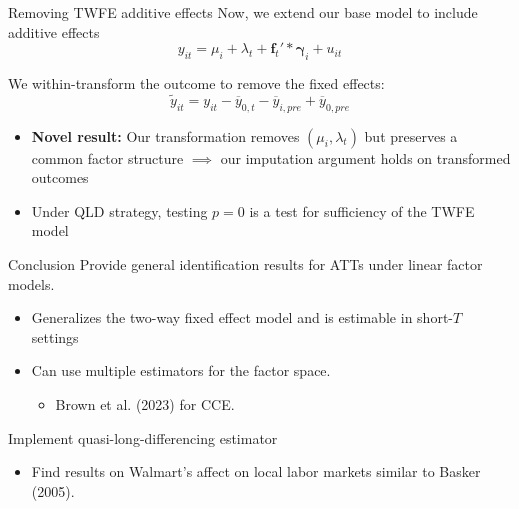 \documentclass[aspectratio=169,t,11pt]{beamer}
\begin{document}
\begin{frame}{Removing TWFE additive effects}\label{slide:remove_additive_fe}
  Now, we extend our base model to include additive effects
  $$
    y_{it} = \mu_i + \lambda_t + \bm{f}_t' * \bm{\gamma}_{i} + u_{it}
  $$
  
  We within-transform the outcome to remove the fixed effects:
  $$
    \tilde{y}_{it} = y_{it} - \overline{y}_{0,t} - \overline{y}_{i,pre} + \overline{y}_{0,pre}
  $$
  \begin{itemize}
    \item \textbf{Novel result:} Our transformation removes $(\mu_i, \lambda_t)$ but preserves a common factor structure $\implies$ our imputation argument holds on transformed outcomes
    
    \item Under QLD strategy, testing $p = 0$ is a test for sufficiency of the TWFE model
  \end{itemize}


\end{frame}


\begin{frame}{Conclusion}
  Provide general identification results for ATTs under linear factor models. 
  \begin{itemize}
      \item Generalizes the two-way fixed effect model and is estimable in short-$T$ settings

      \item Can use multiple estimators for the factor space. 
      \begin{itemize}
          \item Brown et al. (2023) for CCE.
      \end{itemize}
  \end{itemize}

  \bigskip
  Implement quasi-long-differencing estimator
  \begin{itemize}
      \item Find results on Walmart's affect on local labor markets similar to Basker (2005). 
  \end{itemize}
\end{frame}
\end{document}
